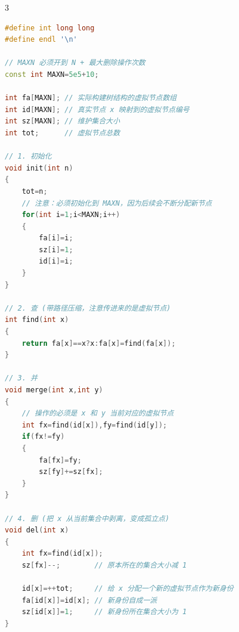 \documentclass[10pt,landscape,a4paper]{article}
\begin{document}
\begin{multicols*}{3}
\begin{lstlisting}[language=C++]
#define int long long
#define endl '\n'

// MAXN 必须开到 N + 最大删除操作次数
const int MAXN=5e5+10; 

int fa[MAXN]; // 实际构建树结构的虚拟节点数组
int id[MAXN]; // 真实节点 x 映射到的虚拟节点编号
int sz[MAXN]; // 维护集合大小
int tot;      // 虚拟节点总数

// 1. 初始化
void init(int n)
{
    tot=n; 
    // 注意：必须初始化到 MAXN，因为后续会不断分配新节点
    for(int i=1;i<MAXN;i++) 
    {
        fa[i]=i;
        sz[i]=1;
        id[i]=i; 
    }
}

// 2. 查 (带路径压缩，注意传进来的是虚拟节点)
int find(int x)
{
    return fa[x]==x?x:fa[x]=find(fa[x]);
}

// 3. 并
void merge(int x,int y)
{
    // 操作的必须是 x 和 y 当前对应的虚拟节点
    int fx=find(id[x]),fy=find(id[y]);
    if(fx!=fy)
    {
        fa[fx]=fy;
        sz[fy]+=sz[fx];
    }
}

// 4. 删 (把 x 从当前集合中剥离，变成孤立点)
void del(int x)
{
    int fx=find(id[x]);
    sz[fx]--;        // 原本所在的集合大小减 1
    
    id[x]=++tot;     // 给 x 分配一个新的虚拟节点作为新身份
    fa[id[x]]=id[x]; // 新身份自成一派
    sz[id[x]]=1;     // 新身份所在集合大小为 1
}
\end{lstlisting}

\end{multicols*}
\end{document}
